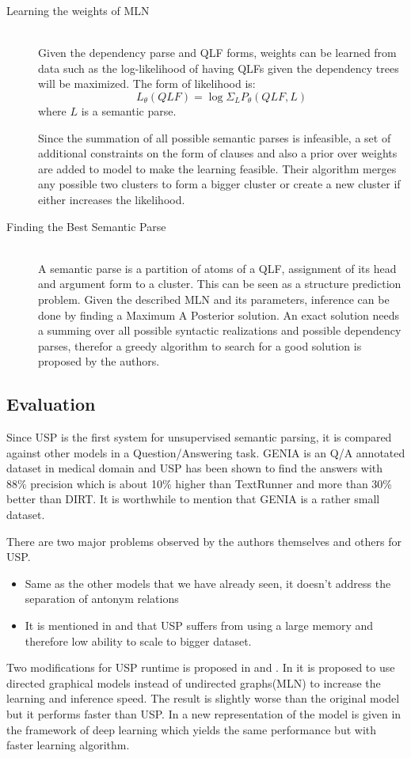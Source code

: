 \documentclass[12pt]{report}
\begin{document}
\begin{description}
  \item[Learning the weights of MLN] \hfill \\
  Given the dependency parse and QLF forms, weights can be learned from data such as the log-likelihood
  of having QLFs given the dependency trees will be maximized. The form of likelihood is:
  $$ L_{\theta}(QLF) = \log{\Sigma_L{P_\theta{(QLF, L)}}}$$ where $L$ is a semantic parse.
  
  Since the summation of all possible semantic parses is infeasible, a set of additional constraints on the form
  of clauses and also a prior over weights are added to model to make the learning feasible. Their algorithm
  merges any possible two clusters to form a bigger cluster or create a new cluster if either increases the likelihood.
  \item[Finding the Best Semantic Parse] \hfill \\
  A semantic parse is a partition of atoms of a QLF, assignment of its head and argument form to a cluster. 
  This can be seen as a structure prediction problem. Given the described MLN and its parameters, inference can
   be done by finding a Maximum A Posterior solution. An exact solution needs a summing over all possible syntactic realizations and
   possible dependency parses, therefor a greedy algorithm to search for a good solution is proposed 
   by the authors.   
\end{description}

\subsection {Evaluation}
\label{ch:evaluation}
Since USP is the first system for unsupervised semantic parsing, it is compared against other models in a Question/Answering task.
GENIA is an Q/A annotated dataset in medical domain and USP has been shown to find the answers with 88\% precision
which is about 10\% higher than TextRunner and more than 30\% better than DIRT. It is worthwhile to mention that
GENIA is a rather small dataset.

There are two major problems observed by the authors themselves and others for USP.
\begin{itemize}
 \item Same as the other models that we have already seen,
 it doesn't address the separation of antonym relations
 \item It is mentioned in \cite{Yao2011} and \cite{Titov2011}
  that USP suffers from using a large memory and therefore low ability to scale to bigger dataset. 
 \end{itemize}
 Two modifications for USP runtime is proposed in \cite{Poon2013} and \cite{Titov2011}.
  In \cite{Titov2011}
   it is proposed to use directed graphical models instead of undirected graphs(MLN) to increase the learning and inference speed.
  The result is slightly worse than the original model but it performs faster than USP.
  In \cite{Poon2013} 
  a new representation of the model is given in the framework of deep learning which yields 
  the same performance but with faster learning algorithm.
  
\end{document}

